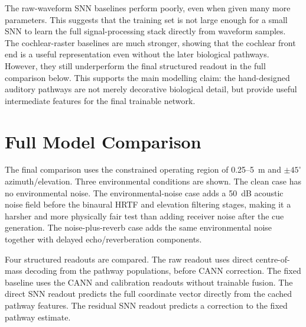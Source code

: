 The raw-waveform SNN baselines perform poorly, even when given many more parameters. This suggests that the training set is not large enough for a small SNN to learn the full signal-processing stack directly from waveform samples. The cochlear-raster baselines are much stronger, showing that the cochlear front end is a useful representation even without the later biological pathways. However, they still underperform the final structured readout in the full comparison below. This supports the main modelling claim: the hand-designed auditory pathways are not merely decorative biological detail, but provide useful intermediate features for the final trainable network.

\section{Full Model Comparison}

The final comparison uses the constrained operating region of 0.25--5~m and $\pm45^\circ$ azimuth/elevation. Three environmental conditions are shown. The clean case has no environmental noise. The environmental-noise case adds a 50~dB acoustic noise field before the binaural HRTF and elevation filtering stages, making it a harsher and more physically fair test than adding receiver noise after the cue generation. The noise-plus-reverb case adds the same environmental noise together with delayed echo/reverberation components.

Four structured readouts are compared. The raw readout uses direct centre-of-mass decoding from the pathway populations, before CANN correction. The fixed baseline uses the CANN and calibration readouts without trainable fusion. The direct SNN readout predicts the full coordinate vector directly from the cached pathway features. The residual SNN readout predicts a correction to the fixed pathway estimate.

